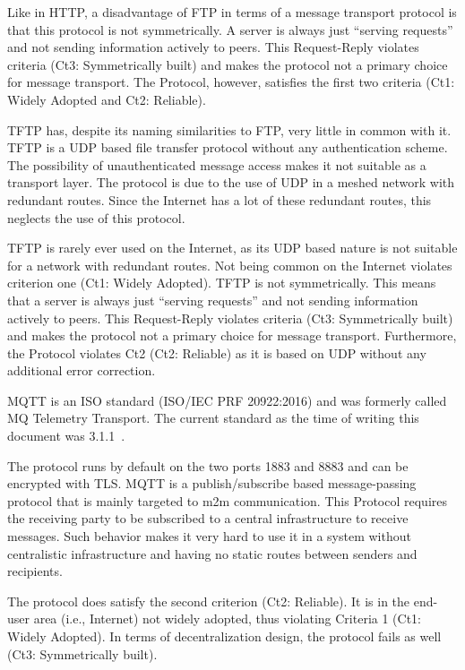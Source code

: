 Like in HTTP, a disadvantage of FTP in terms of a message transport protocol is that this protocol is not symmetrically. A server is always just ``serving requests'' and not sending information actively to peers. This Request-Reply violates criteria (Ct3: Symmetrically built) and makes the protocol not a primary choice for message transport. The Protocol, however, satisfies the first two criteria  (Ct1: Widely Adopted and Ct2: Reliable).

TFTP has, despite its naming similarities to FTP, very little in common with it. TFTP is a UDP based file transfer protocol without any authentication scheme. The possibility of unauthenticated message access makes it not suitable as a transport layer. The protocol is due to the use of UDP in a meshed network with redundant routes. Since the Internet has a lot of these redundant routes, this neglects the use of this protocol.

TFTP is rarely ever used on the Internet, as its UDP based nature is not suitable for a network with redundant routes. Not being common on the Internet violates criterion one (Ct1: Widely Adopted). TFTP is not symmetrically. This means that a server is always just ``serving requests'' and not sending information actively to peers. This Request-Reply violates criteria (Ct3: Symmetrically built) and makes the protocol not a primary choice for message transport. Furthermore, the Protocol violates Ct2 (Ct2: Reliable) as it is based on UDP without any additional error correction.

MQTT is an ISO standard (ISO/IEC PRF 20922:2016) and was formerly called MQ Telemetry Transport. The current standard as the time of writing this document was 3.1.1~\cite{mqtt}. 

The protocol runs by default on the two ports 1883 and 8883 and can be encrypted with TLS. MQTT is a publish/subscribe based message-passing protocol that is mainly targeted to m2m communication. This Protocol requires the receiving party to be subscribed to a central infrastructure to receive messages. Such behavior makes it very hard to use it in a system without centralistic infrastructure and having no static routes between senders and recipients. 

The protocol does satisfy the second criterion (Ct2: Reliable). It is in the end-user area (i.e., Internet) not widely adopted, thus violating Criteria 1 (Ct1: Widely Adopted). In terms of decentralization design, the protocol fails as well (Ct3: Symmetrically built).

